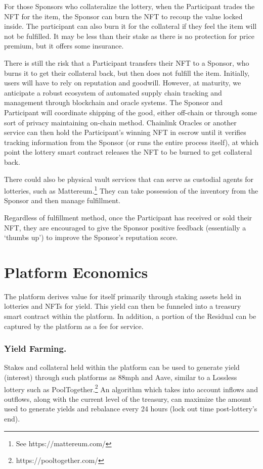 \documentclass[runningheads]{llncs}
\begin{document}
For those Sponsors who collateralize the lottery, when the Participant trades the NFT for the item, the Sponsor can burn the NFT to recoup the value locked inside.  The participant can also burn it for the collateral if they feel the item will not be fulfilled.  It may be less than their stake as there is no protection for price premium, but it offers some insurance.  

There is still the risk that a Participant transfers their NFT to a Sponsor, who burns it to get their collateral back, but then does not fulfill the item.  Initially, users will have to rely on reputation and goodwill.  However, at maturity, we anticipate a robust ecosystem of automated supply chain tracking and management through blockchain and oracle systems.  The Sponsor and Participant will coordinate shipping of the good, either off-chain or through some sort of privacy maintaining on-chain method.  Chainlink Oracles or another service can then hold the Participant’s winning NFT in escrow until it verifies tracking information from the Sponsor (or runs the entire process itself), at which point the lottery smart contract releases the NFT to be burned to get collateral back.

There could also be physical vault services that can serve as custodial agents for lotteries, such as Mattereum.\footnote{See https://mattereum.com/}  They can take possession of the inventory from the Sponsor and then manage fulfillment.

Regardless of fulfillment method, once the Participant has received or sold their NFT, they are encouraged to give the Sponsor positive feedback (essentially a ‘thumbs up’) to improve the Sponsor’s reputation score.


\section{Platform Economics}\label{section-PlatformEconomics}

The platform derives value for itself primarily through staking assets held in lotteries and NFTs for yield.  This yield can then be funneled into a treasury smart contract within the platform.  In addition, a portion of the Residual can be captured by the platform as a fee for service.  

\subsubsection{Yield Farming.}  Stakes and collateral held within the platform can be used to generate yield (interest) through such platforms as 88mph and Aave, similar to a Lossless lottery such as PoolTogether.\footnote{https://pooltogether.com/}   An algorithm which takes into account inflows and outflows, along with the current level of the treasury, can maximize the amount used to generate yields and rebalance every 24 hours (lock out time post-lottery’s end).  
\end{document}
